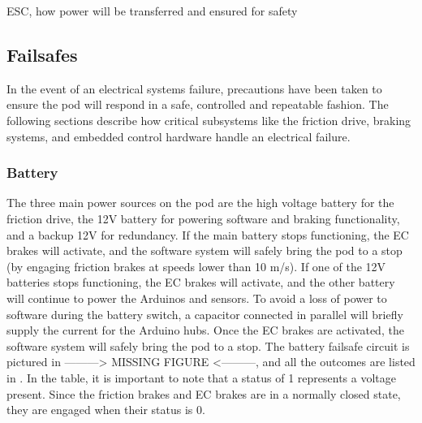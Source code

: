 \documentclass[main.tex]{subfiles}
\begin{document}
    ESC, how power will be transferred and ensured for safety

    \subsection{Failsafes}
    In the event of an electrical systems failure, precautions have been taken to ensure the pod will respond in a safe, controlled and repeatable fashion. The following sections describe how critical subsystems like the friction drive, braking systems, and embedded control hardware handle an electrical failure.
    \subsubsection{Battery}
    The three main power sources on the pod are the high voltage battery for the friction drive, the 12V battery for powering software and braking functionality, and a backup 12V for redundancy.  If the main battery stops functioning, the EC brakes will activate, and the software system will safely bring the pod to a stop (by engaging friction brakes at speeds lower than 10 m/s). If one of the 12V batteries stops functioning, the EC brakes will activate, and the other battery will continue to power the Arduinos and sensors. To avoid a loss of power to software during the battery switch, a capacitor connected in parallel will briefly supply the current for the Arduino hubs. Once the EC brakes are activated, the software system will safely bring the pod to a stop. The battery failsafe circuit is pictured in ---------> MISSING FIGURE <---------, and all the outcomes are listed in . In the table, it is important to note that a status of 1 represents a voltage present. Since the friction brakes and EC brakes are in a normally closed state, they are engaged when their status is 0.
    
\end{document}
